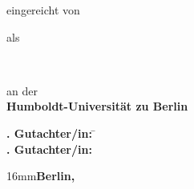 \makeatletter
\begin{titlepage}
	\doublespacing
	\centering%
	\vspace*{-24.5mm}
	\noindent
	\makebox[\textwidth]{\phantom{Vadid Gissnkra}\hspace*{-19mm}}

	\textbf{\Huge\sffamily \@title}\vskip 2.5mm

	\textbf{\Large\sffamily \@subtitle}
	\vfill

	{\large eingereicht von}\\
	\resizebox{%
	\ifdim\width>\textwidth \textwidth \else \width \fi }{!}{%
	\textbf{\Large\sffamily \@author}}
	\vfill

	{\large als}\\ \textbf{\Large\sffamily\degreevar}
	\vfill

	{\large\degreecontextvar}\\ \resizebox{%
	\ifdim\width>\textwidth \textwidth \else \width \fi }{!}{%
	\textbf{\Large\sffamily\programmevar}}
	\vfill

	{\large an der}\\ \textbf{\Large\sffamily Humboldt-Universität zu Berlin}
	\vfill

	\resizebox{%
	\ifdim\width>\textwidth \textwidth \else \width \fi }{!}{%
	\textbf{\Large\sffamily\facultyvar}}

	\resizebox{%
	\ifdim\width>\textwidth \textwidth \else \width \fi }{!}{%
	\textbf{\Large\sffamily\institutevar}}
	\vfill

	\parbox{0cm}{\large%
	\begin{tabbing}
		\textbf{. Gutachter/in:} \= \firstsupervisorvar  \\
		\textbf{. Gutachter/in:} \> \secondsupervisorvar
	\end{tabbing}
	}
	\vfill

	\enlargethispage
	{16mm}\textbf{\large\sffamily Berlin, \@date}
\end{titlepage}
\makeatother